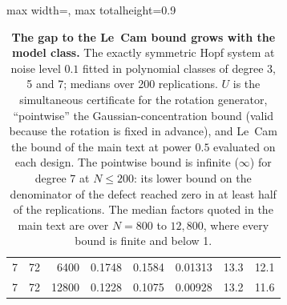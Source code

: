 \begin{table}[!htbp]
\begin{adjustbox}{max width=\textwidth, max totalheight=0.9\textheight}
\begin{tabular}{rrrrrrrr}
7 & 72 & 6400 & 0.1748 & 0.1584 & 0.01313 & 13.3 & 12.1 \\
7 & 72 & 12800 & 0.1228 & 0.1075 & 0.00928 & 13.2 & 11.6 \\
\bottomrule
\end{tabular}
\end{adjustbox}
\caption{\textbf{The gap to the Le~Cam bound grows with the model class.} The exactly symmetric Hopf system at noise level $0.1$ fitted in polynomial classes of degree 3, 5 and 7; medians over 200 replications. $U$ is the simultaneous certificate for the rotation generator, ``pointwise'' the Gaussian-concentration bound (valid because the rotation is fixed in advance), and Le~Cam the bound of the main text at power $0.5$ evaluated on each design. The pointwise bound is infinite ($\infty$) for degree 7 at $N \le 200$: its lower bound on the denominator of the defect reached zero in at least half of the replications. The median factors quoted in the main text are over $N = 800$ to $12{,}800$, where every bound is finite and below 1.}
\label{stab:qsweep}
\end{table}
